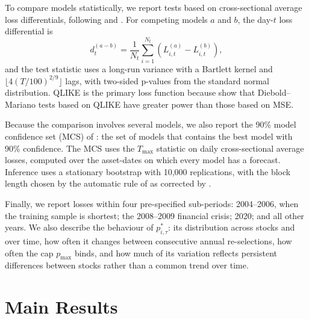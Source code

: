 \documentclass[12pt]{article}
\begin{document}
To compare models statistically, we report \textcite{diebold-1995} tests based on cross-sectional average loss differentials, following \textcite{gu-2020} and \textcite{zhang-2023}. For competing models $a$ and $b$, the day-$t$ loss differential is
\begin{equation}
d_t^{(a-b)}
=
\frac{1}{N_t}
\sum_{i=1}^{N_t}
\left(
L_{i,t}^{(a)}-L_{i,t}^{(b)}
\right),
\end{equation}
and the test statistic uses a \textcite{newey-1987} long-run variance with a Bartlett kernel and $\lfloor 4(T/100)^{2/9}\rfloor$ lags, with two-sided p-values from the standard normal distribution. QLIKE is the primary loss function because \textcite{Patton2009} show that Diebold--Mariano tests based on QLIKE have greater power than those based on MSE.

Because the comparison involves several models, we also report the 90\% model confidence set (MCS) of \textcite{hansen-2011}: the set of models that contains the best model with 90\% confidence. The MCS uses the $T_{\max}$ statistic on daily cross-sectional average losses, computed over the asset-dates on which every model has a forecast. Inference uses a stationary bootstrap with 10,000 replications, with the block length chosen by the automatic rule of \textcite{politis-2004} as corrected by \textcite{patton-2009b}.

Finally, we report losses within four pre-specified sub-periods: 2004--2006, when the training sample is shortest; the 2008--2009 financial crisis; 2020; and all other years. We also describe the behaviour of $p_{i,\tau}^{*}$: its distribution across stocks and over time, how often it changes between consecutive annual re-selections, how often the cap $p_{\max}$ binds, and how much of its variation reflects persistent differences between stocks rather than a common trend over time.

\section{Main Results}

\end{document}
